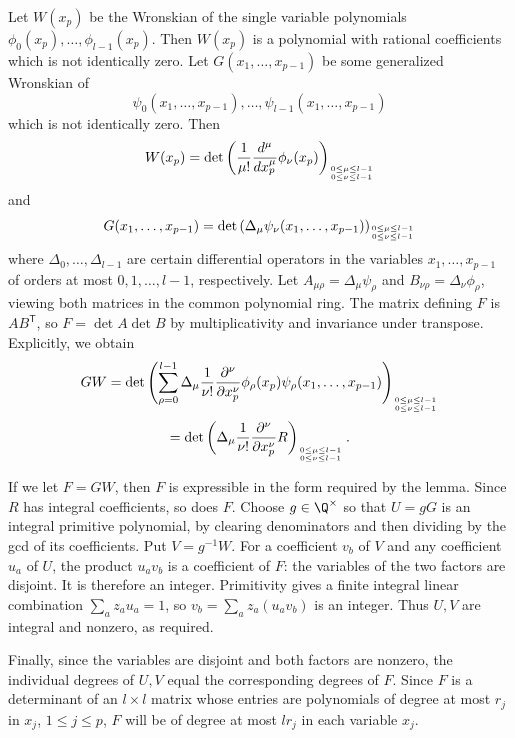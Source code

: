 
Let $W(x_p)$ be the Wronskian of the single variable polynomials $\phi_0(x_p), \dots, \phi_{l-1}(x_p)$. Then $W(x_p)$ is a polynomial with rational coefficients which is not identically zero. Let $G(x_1, \dots, x_{p-1})$ be some generalized Wronskian of
$$
    \psi_0(x_1, \dots, x_{p-1}), \dots, \psi_{l-1}(x_1, \dots, x_{p-1})
    $$
    which is not identically zero. Then
    $$
    W(x_p) = \det \left( \frac{1}{\mu !} \frac{d^\mu}{dx_p^\mu}\phi_\nu(x_p) \right)_{0 \leq \mu \leq l-1 \atop 0 \leq \nu \leq l-1}
    $$
    and
    $$
    G(x_1, \dots, x_{p-1}) = \det \left(\Delta_\mu \psi_\nu (x_1, \dots, x_{p-1}) \right)_{0 \leq \mu \leq l-1 \atop 0 \leq \nu \leq l-1}
    $$
    where $\Delta_0, \dots, \Delta_{l-1}$ are certain differential operators in the variables $x_1, \dots, x_{p-1}$ of orders at most $0, 1, \dots, l-1$, respectively. Let $A_{\mu\rho}=\Delta_\mu\psi_\rho$ and
$B_{\nu\rho}=\Delta_\nu\phi_\rho$, viewing both matrices in the common
polynomial ring. The matrix defining $F$ is $AB^{\mathsf T}$, so
$F=\det A\det B$ by multiplicativity and invariance
under transpose. Explicitly, we obtain
    $$
    GW = \det \left(\sum_{\rho =0}^{l-1} \Delta_\mu \frac{1}{\nu !} \frac{\partial^\nu}{\partial x_p^\nu} \phi_\rho (x_p) \psi_\rho(x_1, \dots, x_{p-1})\right)_{0 \leq \mu \leq l-1 \atop 0 \leq \nu \leq l-1}
    $$
    $$
    = \det \left( \Delta_\mu \frac{1}{\nu !} \frac{\partial^\nu}{\partial x_p^\nu} R \right)_{0 \leq \mu \leq l-1 \atop 0 \leq \nu \leq l-1}.
    $$

    If we let $F = GW$, then $F$ is expressible in the form required by the lemma. Since $R$ has integral coefficients, so does $F$. Choose $g\in\Q^\times$ so that $U=gG$ is an integral primitive
polynomial, by clearing denominators and then dividing by the gcd of its
coefficients. Put $V=g^{-1}W$. For a coefficient $v_b$ of $V$ and any
coefficient $u_a$ of $U$, the product $u_av_b$ is a coefficient of $F$:
the variables of the two factors are disjoint. It is therefore an integer.
Primitivity gives a finite integral linear combination $\sum_a z_au_a=1$,
so $v_b=\sum_a z_a(u_av_b)$ is an integer. Thus $U,V$ are integral and
nonzero, as required.

    Finally, since the variables are disjoint and both factors are nonzero, the individual degrees of $U,V$ equal the corresponding degrees of $F$. Since $F$ is a determinant of an $l\times l$ matrix whose entries are polynomials of degree at most $r_j$ in $x_j$, $1 \leq j \leq p$, $F$ will be of degree at most $l r_j$ in each variable $x_j$.
